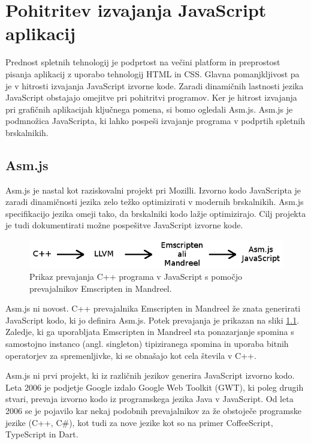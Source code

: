 \chapter{Pohitritev izvajanja JavaScript\\ aplikacij}
\label{sec:asm}
Prednost spletnih tehnologij je podprtost na večini platform in preprostost pisanja aplikacij z uporabo tehnologij HTML in CSS. Glavna pomanjkljivost pa je v hitrosti izvajanja JavaScript izvorne kode. Zaradi dinamičnih lastnosti jezika JavaScript obstajajo omejitve pri pohitritvi programov. Ker je hitrost izvajanja pri grafičnih aplikacijah ključnega pomena, si bomo ogledali Asm.js. Asm.js je podmnožica JavaScripta, ki lahko pospeši izvajanje programa v podprtih spletnih brskalnikih.

\section{Asm.js}

Asm.js \cite{asm} je nastal kot raziskovalni projekt pri Mozilli. Izvorno kodo JavaScripta je zaradi dinamičnosti jezika zelo težko optimizirati v modernih brskalnikih. Asm.js specifikacijo jezika omeji tako, da brskalniki kodo lažje optimizirajo. Cilj projekta je tudi dokumentirati možne pospešitve JavaScript izvorne kode.

\begin{figure}
\begin{center}
\includegraphics[width=12.5cm]{pic/emscr.png}
\end{center}
\caption{Prikaz prevajanja C++ programa v JavaScript s pomočjo prevajalnikov Emscripten in Mandreel.}
\label{emscr}
\end{figure} 

Asm.js ni novost. C++ prevajalnika Emscripten in Mandreel že znata generirati JavaScript kodo, ki jo definira Asm.js. Potek prevajanja je prikazan na sliki \ref{emscr}. Zaledje, ki ga uporabljata Emscripten in Mandreel sta ponazarjanje spomina s samostojno instanco (angl. singleton) tipiziranega spomina in uporaba bitnih operatorjev za spremenljivke, ki se obnašajo kot cela števila v C++.

Asm.js ni prvi projekt, ki iz različnih jezikov generira JavaScript izvorno kodo. Leta 2006 je podjetje Google izdalo Google Web Toolkit (GWT), ki poleg drugih stvari, prevaja izvorno kodo iz programskega jezika Java v JavaScript. Od leta 2006 se je pojavilo kar nekaj podobnih prevajalnikov za že obstoječe programske jezike (C++, C\#), kot tudi za nove jezike kot so na primer CoffeeScript, TypeScript in Dart.

